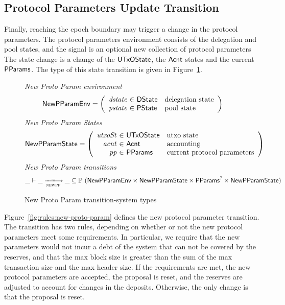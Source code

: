 \clearpage

\subsection{Protocol Parameters Update Transition}
\label{sec:pparam-update}

Finally, reaching the epoch boundary may trigger a change in the protocol parameters.
The protocol parameters environment consists of the delegation and pool states,
and the signal is an optional new collection of protocol parameters
The state change is a change of the $\mathsf{UTxOState}$, the $\mathsf{Acnt}$ states and the current $\mathsf{PParams}$.
The type of this state transition is given in Figure~\ref{fig:ts-types:new-proto-param}.

\begin{figure}[htb]
  \emph{New Proto Param environment}
  \begin{equation*}
    \NewPParamEnv =
    \left(
      \begin{array}{r@{~\in~}ll}
        \var{dstate} & \DState & \text{delegation state}\\
        \var{pstate} & \PState & \text{pool state}\\
      \end{array}
    \right)
  \end{equation*}
  \emph{New Proto Param States}
  \begin{equation*}
    \NewPParamState =
    \left(
      \begin{array}{r@{~\in~}ll}
        \var{utxoSt} & \UTxOState & \text{utxo state}\\
        \var{acnt} & \Acnt & \text{accounting}\\
        \var{pp} & \PParams & \text{current protocol parameters}\\
      \end{array}
    \right)
  \end{equation*}
  \emph{New Proto Param transitions}
  \begin{equation*}
    \_ \vdash
    \var{\_} \trans{newpp}{\_} \var{\_}
    \subseteq \powerset (\NewPParamEnv \times \NewPParamState \times \PParams^? \times \NewPParamState)
  \end{equation*}
  \caption{New Proto Param transition-system types}
  \label{fig:ts-types:new-proto-param}
\end{figure}


Figure~\ref{fig:rules:new-proto-param} defines the new protocol parameter transition.
The transition has two rules, depending on whether or not the new protocol parameters
meet some requirements.
In particular, we require that the new parameters would not incur a debt of the system that
can not be covered by the reserves, and that the max block size is greater than the sum of the
max transaction size and the max header size.
If the requirements are met, the new protocol parameters are accepted, the proposal is reset,
and the reserves are adjusted to account for changes in the deposits.
Otherwise, the only change is that the proposal is reset.

